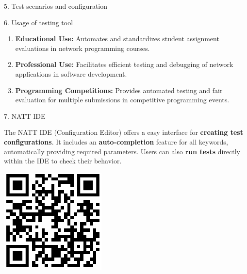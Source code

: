 \documentclass[final]{beamer}
\newlength{\colwidth}
\begin{document}
\begin{frame}[t]
\begin{columns}[t]
\begin{column}{\colwidth}
\begin{block}{5. Test scenarios and configuration}
  \end{block}

  \begin{exampleblock}{6. Usage of testing tool}

    \begin{enumerate}
      \item \textbf{Educational Use:} Automates and standardizes student assignment evaluations in network programming courses.
      
      \item \textbf{Professional Use:} Facilitates efficient testing and debugging of network applications in software development.
      
      \item \textbf{Programming Competitions:} Provides automated testing and fair evaluation for multiple submissions in competitive programming events.
   \end{enumerate}
 
  \end{exampleblock}

  \begin{block}{7. NATT IDE}

    \begin{minipage}{0.7\textwidth}
      The NATT IDE (Configuration Editor) offers a easy interface for \textbf{creating test configurations}. It includes an \textbf{auto-completion} feature for all keywords, automatically providing required parameters. Users can also \textbf{run tests} directly within the IDE to check their behavior.
    \end{minipage}
    \hfill
    \noindent\begin{minipage}{0.25\textwidth}
      \includegraphics[width=\textwidth]{./imgs/github-qr.png}
    \end{minipage}


\end{block}
\end{column}
\end{columns}
\end{frame}
\end{document}
